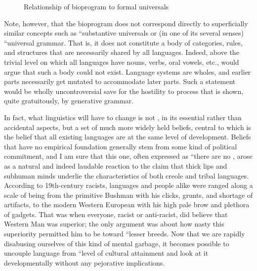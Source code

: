 \begin{figure}
	\begin{center}
	\end{center}
	\caption{Relationship of bioprogram to formal universals}\label{fig:5.1}
\end{figure}

Note, however, that the bioprogram does not correspond directly to superficially similar concepts such as ``substantive universals or (in one of its several senses) ``universal grammar. That is, it does not constitute a body of categories, rules, and structures that are necessarily shared by all languages. Indeed, above the trivial level on which all languages have nouns, verbs, oral vowels, etc., would argue that such a body could not exist. Language systems are wholes, and earlier parts necessarily get mutated to accommodate later parts. Such a statement would be wholly uncontroversial save for the hostility to process that is shown, quite gratuitously, by generative grammar.

In fact, what linguistics will have to change is not , in its essential rather than accidental aspects, but a set of much more widely held beliefs, central to which is the belief that all existing languages are at the same level of development. Beliefs that have no empirical foundation generally stem from some kind of politi\-cal commitment, and I am sure that this one, often expressed as ``there are no , arose as a natural and indeed laudable reaction to the claim that thick lips and subhuman minds underlie the characteristics of both creole and tribal languages. According to 19th-century racists, languages and people alike were ranged along a scale of being from the primitive Bushman with his clicks, grunts, and shortage of artifacts, to the modern Western European with his high pale brow and plethora of gadgets. That was when everyone, racist or anti-racist, did believe that Western Man was superior; the only argument was about how nasty this superiority permitted him to be toward ``lesser breeds. Now that we are rapidly disabusing ourselves of this kind of mental garbage, it becomes possible to uncouple language from ``level of cultural attainment and look at it developmentally without any pejorative implications.

